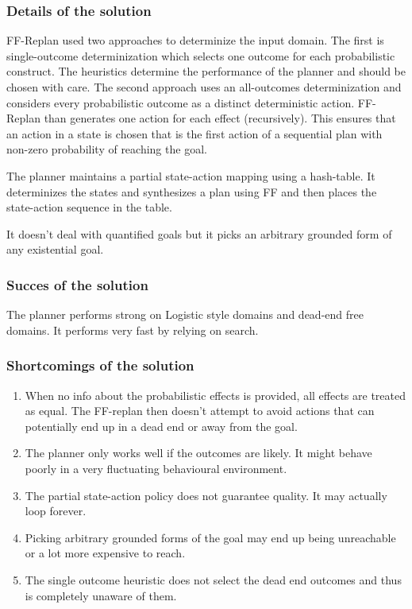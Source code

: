 \documentclass[runningheads,a4paper]{llncs}
\begin{document}
\subsubsection{Details of the solution}
FF-Replan used two approaches to determinize the input domain. The first is single-outcome determinization which selects one outcome for each probabilistic construct. The heuristics determine the performance of the planner and should be chosen with care. The second approach uses an all-outcomes determinization and considers every probabilistic outcome as a distinct deterministic action. FF-Replan than generates one action for each effect (recursively). This ensures that an action in a state is chosen that is the first action of a sequential plan with non-zero probability of reaching the goal.

The planner maintains a partial state-action mapping using a hash-table. It determinizes the states and synthesizes a plan using FF and then places the state-action sequence in the table.

It doesn't deal with quantified goals but it picks an arbitrary grounded form of any existential goal.

\subsubsection{Succes of the solution}
The planner performs strong on Logistic style domains and dead-end free domains. It performs very fast by relying on search.

\subsubsection{Shortcomings of the solution}
\begin{enumerate}
	\item When no info about the probabilistic effects is provided, all effects are treated as equal. The FF-replan then doesn't attempt to avoid actions that can potentially end up in a dead end or away from the goal.
	\item  The planner only works well if the outcomes are likely. It might behave poorly in a very fluctuating behavioural environment.
	\item The partial state-action policy does not guarantee quality. It may actually loop forever.
	\item Picking arbitrary grounded forms of the goal may end up being unreachable or a lot more expensive to reach.
	\item The single outcome heuristic does not select the dead end outcomes and thus is completely unaware of them.
\end{enumerate}
\end{document}
